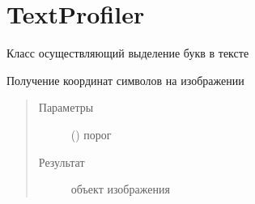 \documentclass[letterpaper,10pt,russian]{sphinxmanual}
\begin{document}
\section{TextProfiler}
\label{\detokenize{TextProfiler:textprofiler}}\label{\detokenize{TextProfiler::doc}}

\begin{fulllineitems}
\label{\detokenize{TextProfiler:TextProfiler.TextProfiler}}
Класс осуществляющий выделение букв в тексте

\begin{fulllineitems}
\label{\detokenize{TextProfiler:TextProfiler.TextProfiler.get_text_segmentation}}
Получение координат символов на изображении
\begin{quote}\begin{description}
\item[{Параметры}] \leavevmode
{} () \textendash{} порог

\item[{Результат}] \leavevmode
{\hyperref[\detokenize{BaseImage:core.LabImage}]{}} \textendash{} объект изображения

\end{description}\end{quote}

\end{fulllineitems}


\end{fulllineitems}

\label{\detokenize{TextProfiler:module-TextProfiler}}
\end{document}
